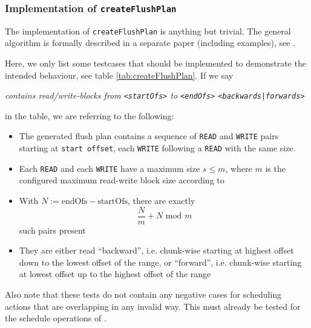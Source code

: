 
\subsubsection{Implementation of \texttt{createFlushPlan}}
\label{sec:flushingPlan}

The implementation of \texttt{createFlushPlan} is anything but trivial. The general algorithm is formally described in a separate paper (including examples), see \cite{CFPPaper}.

Here, we only list some testcases that should be implemented to demonstrate the intended behaviour, see table \ref{tab:createFlushPlan}. If we say

\emph{contains read/write-blocks from \texttt{<startOfs>} to \texttt{<endOfs>} \texttt{<backwards|forwards>}}

in the table, we are referring to the following:
\begin{itemize}
\item The generated flush plan contains a sequence of \texttt{READ} and \texttt{WRITE} pairs starting at \texttt{start offset}, each \texttt{WRITE} following a \texttt{READ} with the same size.
\item Each \texttt{READ} and each \texttt{WRITE} have a maximum size $s\leq m$, where $m$ is the configured maximum read-write block size according to 
\item With $N:=\text{endOfs} - \text{startOfs}$, there are exactly \[\frac{N}{m}+N\text{ mod }m\] such pairs present
\item They are either read ``backward'', i.e. chunk-wise starting at highest offset down to the lowest offset of the range, or ``forward'', i.e. chunk-wise starting at lowest offset up to the highest offset of the range
\end{itemize}

Also note that these tests do not contain any negative cases for scheduling actions that are overlapping in any invalid way. This must already be tested for the schedule operations of \MediumChangeManager{}.

